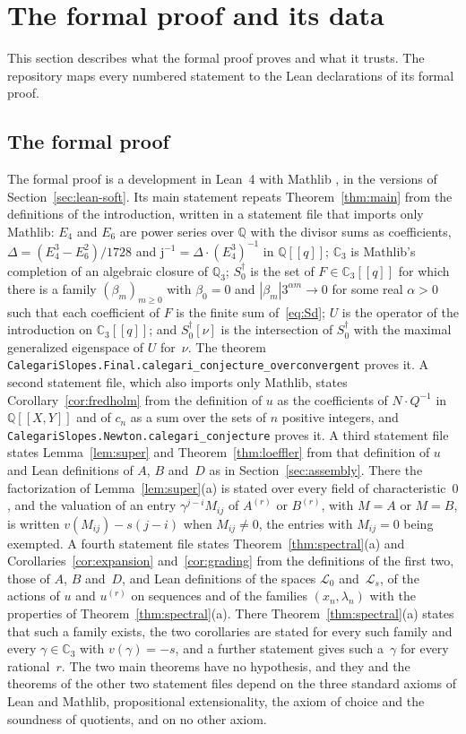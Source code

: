 \documentclass[11pt]{amsart}
\theoremstyle{definition}
\numberwithin{equation}{section}
\newcommand{\Q}{\mathbb{Q}}
\newcommand{\Cp}{\mathbb{C}_3}
\newcommand{\Qp}{\mathbb{Q}_3}
\newcommand{\Sd}{S_0^{\dagger}}
\newcommand{\jj}{\mathrm{j}}
\newcommand{\jinv}{\jj^{-1}}
\newcommand{\cL}{\mathcal{L}}
\newcommand{\Lc}{\mathcal{L}_0}
\begin{document}
\section{The formal proof and its data}\label{sec:lean}

This section describes what the formal proof proves and what it trusts. The repository maps every numbered statement to the Lean declarations of its formal proof.

\subsection{The formal proof}\label{sec:lean-proof}
The formal proof \cite{CSLean} is a development in Lean~4 \cite{Lean4} with Mathlib \cite{Mathlib20}, in the versions of Section~\ref{sec:lean-soft}. Its main statement repeats Theorem~\ref{thm:main} from the definitions of the introduction, written in a statement file that imports only Mathlib: $E_4$ and $E_6$ are power series over $\Q$ with the divisor sums as coefficients, $\Delta=(E_4^3-E_6^2)/1728$ and $\jinv=\Delta\cdot(E_4^3)^{-1}$ in $\Q[[q]]$; $\Cp$ is Mathlib's completion of an algebraic closure of $\Qp$; $\Sd$ is the set of $F\in\Cp[[q]]$ for which there is a family $(\beta_m)_{m\ge0}$ with $\beta_0=0$ and $|\beta_m|3^{\alpha m}\to0$ for some real $\alpha>0$ such that each coefficient of $F$ is the finite sum of~\eqref{eq:Sd}; $U$ is the operator of the introduction on $\Cp[[q]]$; and $\Sd[\nu]$ is the intersection of $\Sd$ with the maximal generalized eigenspace of $U$ for~$\nu$. The theorem \texttt{CalegariSlopes.Final.calegari\_conjecture\_overconvergent} proves it. A second statement file, which also imports only Mathlib, states Corollary~\ref{cor:fredholm} from the definition of $u$ as the coefficients of $N\cdot Q^{-1}$ in $\Q[[X,Y]]$ and of $c_n$ as a sum over the sets of $n$ positive integers, and \texttt{CalegariSlopes.Newton.calegari\_conjecture} proves it. A third statement file states Lemma~\ref{lem:super} and Theorem~\ref{thm:loeffler} from that definition of $u$ and Lean definitions of $A$, $B$ and~$D$ as in Section~\ref{sec:assembly}. There the factorization of Lemma~\ref{lem:super}(a) is stated over every field of characteristic~$0$, and the valuation of an entry $\gamma^{j-i}M_{ij}$ of $A^{(r)}$ or $B^{(r)}$, with $M=A$ or $M=B$, is written $v(M_{ij})-s(j-i)$ when $M_{ij}\ne0$, the entries with $M_{ij}=0$ being exempted. A fourth statement file states Theorem~\ref{thm:spectral}(a) and Corollaries~\ref{cor:expansion} and~\ref{cor:grading} from the definitions of the first two, those of $A$, $B$ and~$D$, and Lean definitions of the spaces $\Lc$ and~$\cL_s$, of the actions of $u$ and $u^{(r)}$ on sequences and of the families $(x_n,\lambda_n)$ with the properties of Theorem~\ref{thm:spectral}(a). There Theorem~\ref{thm:spectral}(a) states that such a family exists, the two corollaries are stated for every such family and every $\gamma\in\Cp$ with $v(\gamma)=-s$, and a further statement gives such a~$\gamma$ for every rational~$r$. The two main theorems have no hypothesis, and they and the theorems of the other two statement files depend on the three standard axioms of Lean and Mathlib, propositional extensionality, the axiom of choice and the soundness of quotients, and on no other axiom.
\end{document}

